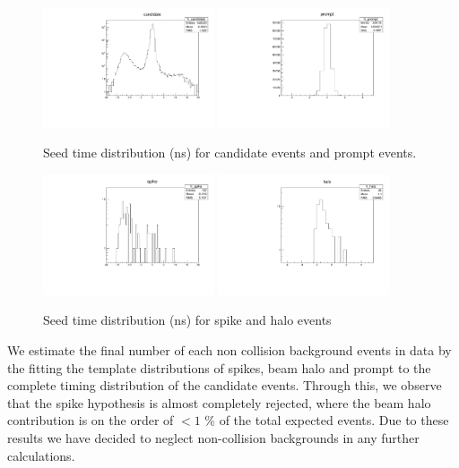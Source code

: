 \begin{figure}[h]
\centering
{\label{fig:candidate}\includegraphics[width=0.45\textwidth]{analysis_figs/candidate_temp.pdf}}
{\label{fig:PromptTempl}\includegraphics[width=0.45\textwidth]{analysis_figs/prompt.pdf}}
\caption{Seed time distribution (ns) for candidate events and prompt events.}
\end{figure}

\begin{figure}[h!]
\centering
{\label{fig:SpikeTempl}\includegraphics[width=0.45\textwidth]{analysis_figs/spike.pdf}}
{\label{fig:PromptTempl}\includegraphics[width=0.45\textwidth]{analysis_figs/halo.pdf}}
\caption{Seed time distribution (ns) for spike and halo events}
\end{figure}

We estimate the final number of each non collision background events in data by the fitting the template distributions of spikes, beam halo and prompt to the complete timing distribution of the candidate events. Through this, we observe that the spike hypothesis is almost completely rejected, where the beam halo contribution is on the order of $< 1$ \% of the total expected events. Due to these results we have decided to neglect non-collision backgrounds in any further calculations.

